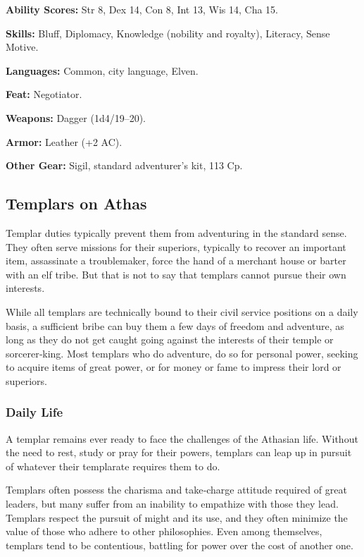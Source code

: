 \textbf{Ability Scores:} Str 8, Dex 14, Con 8, Int 13, Wis 14, Cha 15.

\textbf{Skills:} Bluff, Diplomacy, Knowledge (nobility and royalty), Literacy, Sense Motive.

\textbf{Languages:} Common, city language, Elven.

\textbf{Feat:} Negotiator.

\textbf{Weapons:} Dagger (1d4/19–20).

\textbf{Armor:} Leather (+2 AC).

\textbf{Other Gear:} Sigil, standard adventurer's kit, 113 Cp.

\subsection{Templars on Athas}

Templar duties typically prevent them from adventuring in the standard sense. They often serve missions for their superiors, typically to recover an important item, assassinate a troublemaker, force the hand of a merchant house or barter with an elf tribe. But that is not to say that templars cannot pursue their own interests.

While all templars are technically bound to their civil service positions on a daily basis, a sufficient bribe can buy them a few days of freedom and adventure, as long as they do not get caught going against the interests of their temple or sorcerer‐king. Most templars who do adventure, do so for personal power, seeking to acquire items of great power, or for money or fame to impress their lord or superiors.

\subsubsection{Daily Life}
A templar remains ever ready to face the challenges of the Athasian life. Without the need to rest, study or pray for their powers, templars can leap up in pursuit of whatever their templarate requires them to do.

Templars often possess the charisma and take‐charge attitude required of great leaders, but many suffer from an inability to empathize with those they lead. Templars respect the pursuit of might and its use, and they often minimize the value of those who adhere to other philosophies. Even among themselves, templars tend to be contentious, battling for power over the cost of another one.

